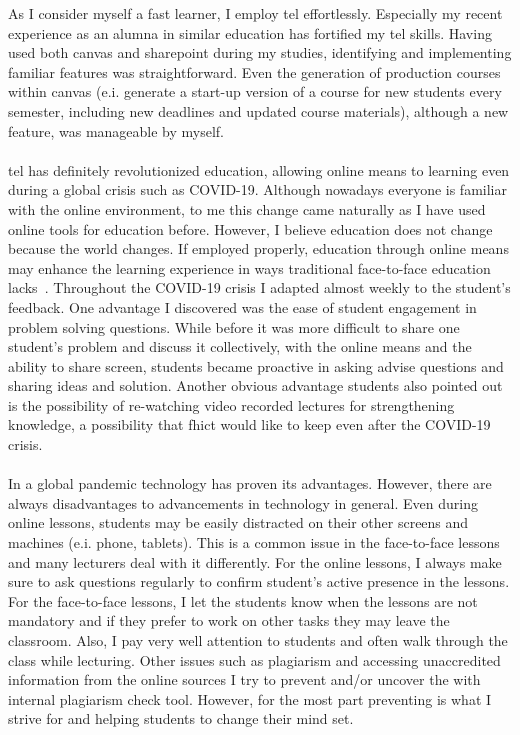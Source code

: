 As I consider myself a fast learner, I employ \acrshort{tel} effortlessly. Especially my recent experience as an alumna in similar education has fortified my \acrshort{tel} skills. 
Having used both \gls{canvas} and \gls{sharepoint} during my studies, identifying and implementing familiar features was straightforward. 
Even the generation of production courses within \gls{canvas} (e.i. generate a start-up version of a course for new students every semester, including new deadlines and updated course materials), although a new feature, was manageable by myself.
\\\\
\acrshort{tel} has definitely revolutionized education, allowing online means to learning even during a global crisis such as COVID-19. 
Although nowadays everyone is familiar with the online environment, to me this change came naturally as I have used online tools for education before. However, I believe education does not change because the world changes. 
If employed properly, education through online means may enhance the learning experience in ways traditional face-to-face education lacks~\cite{blended2020}. 
Throughout the COVID-19 crisis I adapted almost weekly to the student's feedback. 
One advantage I discovered was the ease of student engagement in problem solving questions. 
While before it was more difficult to share one student's problem and discuss it collectively, with the online means and the ability to share screen, students became proactive in asking advise questions and sharing ideas and solution. 
Another obvious advantage students also pointed out is the possibility of re-watching video recorded lectures for strengthening knowledge, a possibility that \acrshort{fhict} would like to keep even after the COVID-19 crisis.
\\\\
In a global pandemic technology has proven its advantages. However, there are always disadvantages to advancements in technology in general.
Even during online lessons, students may be easily distracted on their other screens and machines (e.i. phone, tablets). 
This is a common issue in the face-to-face lessons and many lecturers deal with it differently. 
For the online lessons, I always make sure to ask questions regularly to confirm student's active presence in the lessons. 
For the face-to-face lessons, I let the students know when the lessons are not mandatory and if they prefer to work on other tasks they may leave the classroom. 
Also, I pay very well attention to students and often walk through the class while lecturing.
Other issues such as plagiarism and accessing unaccredited information from the online sources I try to prevent and/or uncover the with internal plagiarism check tool. However, for the most part preventing is what I strive for and helping students to change their mind set.
